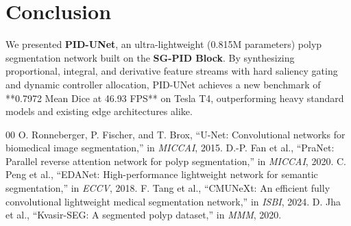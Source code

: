 \documentclass[conference]{IEEEtran}
\begin{document}
\section{Conclusion}
We presented \textbf{PID-UNet}, an ultra-lightweight (0.815M parameters) polyp segmentation network built on the \textbf{SG-PID Block}. By synthesizing proportional, integral, and derivative feature streams with hard saliency gating and dynamic controller allocation, PID-UNet achieves a new benchmark of **0.7972 Mean Dice at 46.93 FPS** on Tesla T4, outperforming heavy standard models and existing edge architectures alike.


\begin{thebibliography}{00}
 O. Ronneberger, P. Fischer, and T. Brox, ``U-Net: Convolutional networks for biomedical image segmentation,'' in \textit{MICCAI}, 2015.
 D.-P. Fan et al., ``PraNet: Parallel reverse attention network for polyp segmentation,'' in \textit{MICCAI}, 2020.
 C. Peng et al., ``EDANet: High-performance lightweight network for semantic segmentation,'' in \textit{ECCV}, 2018.
 F. Tang et al., ``CMUNeXt: An efficient fully convolutional lightweight medical segmentation network,'' in \textit{ISBI}, 2024.
 D. Jha et al., ``Kvasir-SEG: A segmented polyp dataset,'' in \textit{MMM}, 2020.
\end{thebibliography}
\end{document}
